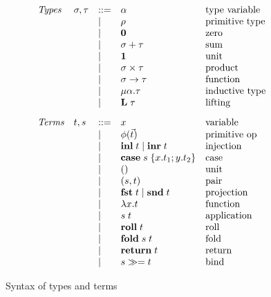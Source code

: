 \begin{figure}
  \small
  \[
  \begin{array}{lllll}
    \textit{Types} &
    \sigma, \tau
    & ::= &
    \alpha
    &
    \text{type variable}
    \\
    && \mid &
    \rho
    &
    \text{primitive type}
    \\
    && \mid &
    \mathbf{0}
    &
    \text{zero}
    \\
    && \mid &
    \sigma + \tau
    &
    \text{sum}
    \\
    && \mid &
    \mathbf{1}
    &
    \text{unit}
    \\
    && \mid &
    \sigma \times \tau
    &
    \text{product}
    \\
    && \mid &
    \sigma \to \tau
    &
    \text{function}
    \\
    && \mid &
    \mu\alpha.\tau
    &
    \text{inductive type}
    \\
    && \mid &
    \mathbf{L}\;\tau
    &
    \text{lifting}
    \\[3mm]
    \textit{Terms} &
    t, s
    & ::= &
    x
    &
    \text{variable}
    \\
    && \mid &
    \phi(\vec t)
    &
    \text{primitive op}
    \\
    && \mid &
    \mathbf{inl}\;t \mid \mathbf{inr}\;t
    &
    \text{injection}
    \\
    && \mid &
    \mathbf{case}\;s\;\{x.t_1; y.t_2\}
    &
    \text{case}
    \\
    && \mid &
    ()
    &
    \text{unit}
    \\
    && \mid &
    (s,t)
    &
    \text{pair}
    \\
    && \mid &
    \mathbf{fst}\;t \mid \mathbf{snd}\;t
    &
    \text{projection}
    \\
    && \mid &
    \lambda x.t
    &
    \text{function}
    \\
    && \mid &
    s\;t
    &
    \text{application}
    \\
    && \mid &
    \mathbf{roll}\;t
    &
    \text{roll}
    \\
    && \mid &
    \mathbf{fold}\;s\;t
    &
    \text{fold}
    \\
    && \mid &
    \mathbf{return}\;t
    &
    \text{return}
    \\
    && \mid &
    {s}\gg={t}
    &
    \text{bind}
  \end{array}
  \]
  \caption{Syntax of types and terms}
  \label{fig:syntax}
\end{figure}
